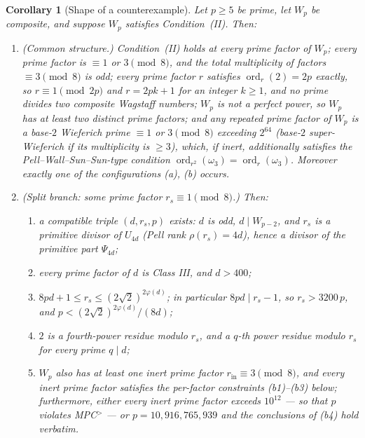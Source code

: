 \documentclass[11pt]{amsart}
\theoremstyle{plain}
\newtheorem{corollary}[theorem]{Corollary}
\theoremstyle{definition}
\theoremstyle{remark}
\numberwithin{equation}{section}
\newcommand{\ord}{\operatorname{ord}}
\begin{document}
\begin{corollary}[Shape of a counterexample]\label{cor:counterexample-shape}
Let $p \geq 5$ be prime, let $W_p$ be composite, and suppose $W_p$
satisfies Condition~(II). Then:

\begin{enumerate}
\item[(0)] \emph{(Common structure.)} Condition~(II) holds at every prime
factor of $W_p$; every prime factor is $\equiv 1$ or $3 \pmod 8$, and the
total multiplicity of factors $\equiv 3 \pmod 8$ is odd; every prime
factor $r$ satisfies $\ord_r(2) = 2p$ exactly, so $r \equiv 1 \pmod{2p}$
and $r = 2pk + 1$ for an integer $k \geq 1$, and no prime divides two
composite Wagstaff numbers; $W_p$ is not a perfect power, so $W_p$ has at
least two distinct prime factors; and any \emph{repeated} prime factor of
$W_p$ is a base-$2$ Wieferich prime $\equiv 1$ or $3 \pmod 8$ exceeding
$2^{64}$ (base-$2$ \emph{super}-Wieferich if its multiplicity is
$\geq 3$), which, if inert, additionally satisfies the
Pell--Wall--Sun--Sun-type condition
$\ord_{r^2}(\omega_3) = \ord_r(\omega_3)$.
Moreover exactly one of the configurations (a), (b) occurs.

\item[(a)] \emph{(Split branch: some prime factor
$r_s \equiv 1 \pmod 8$.)} Then:
  \begin{enumerate}
  \item[(a1)] a compatible triple $(d, r_s, p)$ exists: $d$ is odd,
  $d \mid W_{p-2}$, and $r_s$ is a primitive divisor of $U_{4d}$ (Pell
  rank $\rho(r_s) = 4d$), hence a divisor of the primitive part
  $\Psi_{4d}$;
  \item[(a2)] every prime factor of $d$ is Class III, and $d > 400$;
  \item[(a3)] $8 p d + 1 \leq r_s \leq (2\sqrt 2)^{2\varphi(d)}$; in
  particular $8 p d \mid r_s - 1$, so $r_s > 3200\,p$, and
  $p < (2\sqrt 2)^{2\varphi(d)}/(8 d)$;
  \item[(a4)] $2$ is a fourth-power residue modulo $r_s$, and a $q$-th
  power residue modulo $r_s$ for every prime $q \mid d$;
  \item[(a5)] $W_p$ also has at least one inert prime factor
  $r_{\mathrm{in}} \equiv 3 \pmod 8$, and every inert prime factor
  satisfies the per-factor constraints (b1)--(b3) below; furthermore,
  either every inert prime factor exceeds $10^{12}$ --- so that $p$
  violates MPC$^{>}$ --- or $p = 10{,}916{,}765{,}939$ and the
  conclusions of (b4) hold verbatim.
  \end{enumerate}


\end{enumerate}
\end{corollary}
\end{document}
